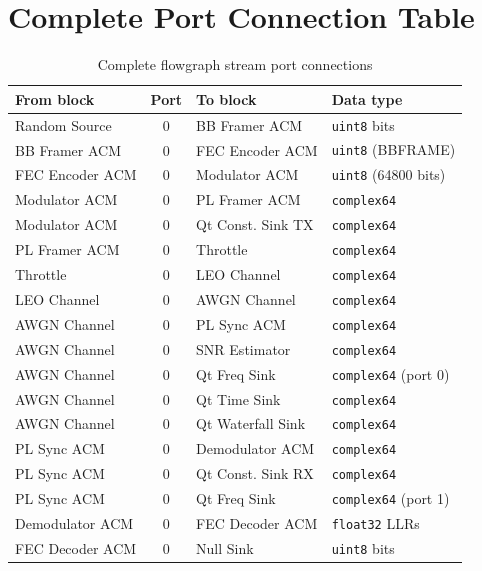 \documentclass[12pt,a4paper]{report}
\begin{document}
\section{Complete Port Connection Table}

\begin{table}[H]
\centering
\caption{Complete flowgraph stream port connections}
\label{tab:connections}
\begin{tabular}{p{4.5cm}cp{4.5cm}l}
\toprule
\textbf{From block} & \textbf{Port} & \textbf{To block} & \textbf{Data type} \\
\midrule
Random Source      & 0 & BB Framer ACM       & \texttt{uint8} bits \\
BB Framer ACM      & 0 & FEC Encoder ACM     & \texttt{uint8} (BBFRAME) \\
FEC Encoder ACM    & 0 & Modulator ACM       & \texttt{uint8} (64800 bits) \\
Modulator ACM      & 0 & PL Framer ACM       & \texttt{complex64} \\
Modulator ACM      & 0 & Qt Const. Sink TX   & \texttt{complex64} \\
PL Framer ACM      & 0 & Throttle            & \texttt{complex64} \\
Throttle           & 0 & LEO Channel         & \texttt{complex64} \\
LEO Channel        & 0 & AWGN Channel        & \texttt{complex64} \\
AWGN Channel       & 0 & PL Sync ACM         & \texttt{complex64} \\
AWGN Channel       & 0 & SNR Estimator       & \texttt{complex64} \\
AWGN Channel       & 0 & Qt Freq Sink        & \texttt{complex64} (port 0) \\
AWGN Channel       & 0 & Qt Time Sink        & \texttt{complex64} \\
AWGN Channel       & 0 & Qt Waterfall Sink   & \texttt{complex64} \\
PL Sync ACM        & 0 & Demodulator ACM     & \texttt{complex64} \\
PL Sync ACM        & 0 & Qt Const. Sink RX   & \texttt{complex64} \\
PL Sync ACM        & 0 & Qt Freq Sink        & \texttt{complex64} (port 1) \\
Demodulator ACM    & 0 & FEC Decoder ACM     & \texttt{float32} LLRs \\
FEC Decoder ACM    & 0 & Null Sink           & \texttt{uint8} bits \\

\end{tabular}
\end{table}
\end{document}
